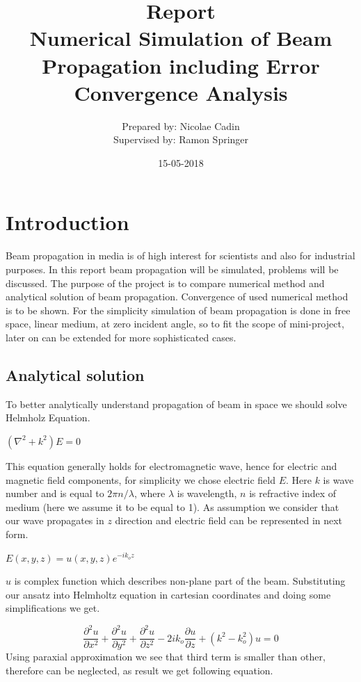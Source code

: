\documentclass{article}
\title{Report\\Numerical Simulation of Beam Propagation including Error Convergence Analysis}
\date{15-05-2018}
\author{Prepared by: Nicolae Cadin \\Supervised by: Ramon Springer}
\begin{document}
	
	
	\maketitle
	\newpage
	\tableofcontents
	
	\newpage
	\section{Introduction}
	Beam propagation in media is of high interest for scientists and also for industrial purposes. 
	In this report beam propagation will be simulated, problems will be discussed. The purpose of the project is to compare numerical method and analytical solution of beam propagation. Convergence of used numerical method is to be shown. For the simplicity simulation of beam propagation is done in free space, linear medium, at zero incident angle, so to fit the scope of mini-project, later on can be extended for more sophisticated cases.
	\subsection{Analytical solution}
	To better analytically understand propagation of beam in space we should solve Helmholz Equation.
	\begin{center}
		$(\nabla^2+k^2)E = 0$		
	\end{center}
	This equation generally holds for electromagnetic wave, hence for electric and magnetic field components, for simplicity we chose electric field $E$. Here $k$ is wave number and is equal to $2\pi n/\lambda$, where $\lambda$ is wavelength, $n$ is refractive index of medium (here we assume it to be equal to 1). As assumption we consider that our wave propagates in $z$ direction and electric field can be represented in next form.
	\begin{center}
		$E(x,y,z)=u(x,y,z)e^{-ik_oz}$
	\end{center}
	$u$ is complex function which describes non-plane part of the beam. Substituting our ansatz into Helmholtz equation in cartesian coordinates and doing some simplifications we get.

	\[\frac{\partial^2 u}{\partial x^2}+ \frac{\partial^2 u}{\partial y^2}+ \frac{\partial^2 u}{\partial z^2} - 2ik_o\frac{\partial u}{\partial z}+(k^2-k_o^2)u=0\]
	Using paraxial approximation we see that third term is smaller than other, therefore can be neglected, as result we get following equation.
	
\end{document}
